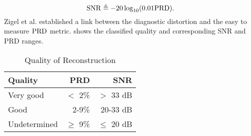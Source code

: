 \begin{equation}
\label{eq:snr}
\mathrm{SNR} \triangleq -20 \log_{10}(0.01 \mathrm{PRD}).
\end{equation}
Zigel et al. \cite{zigel2000weighted} established 
a link between the diagnostic distortion and
the easy to measure $\mathrm{PRD}$ metric.
 shows the classified quality
and corresponding SNR and PRD ranges.
\begin{table}[ht]
\centering
\caption{Quality of Reconstruction \cite{zigel2000weighted}}
\begin{tabular}{lrr}
\toprule
Quality & PRD & SNR \\
\midrule 
Very good & $<$ 2\% & $>$ 33 dB \\
Good & 2-9\% & 20-33 dB \\
Undetermined & $\geq$ 9\% & $\leq$ 20 dB\\
\bottomrule
\end{tabular}
\label{tbl-quality-prd-snr}
\end{table}
